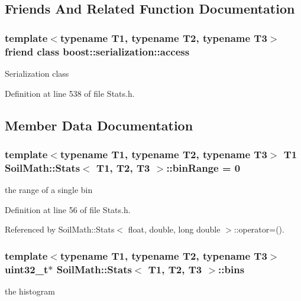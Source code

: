 \subsection{Friends And Related Function Documentation}
\hypertarget{class_soil_math_1_1_stats_ac98d07dd8f7b70e16ccb9a01abf56b9c}{}
\subsubsection[{boost\+::serialization\+::access}]{\setlength{\rightskip}{0pt plus 5cm}template$<$typename T1, typename T2, typename T3$>$ friend class boost\+::serialization\+::access\hspace{0.3cm}{\ttfamily [friend]}}\label{class_soil_math_1_1_stats_ac98d07dd8f7b70e16ccb9a01abf56b9c}
Serialization class 

Definition at line 538 of file Stats.\+h.



\subsection{Member Data Documentation}
\hypertarget{class_soil_math_1_1_stats_a00be1d2a705a8aba532fbe726001bbb2}{}
\subsubsection[{bin\+Range}]{\setlength{\rightskip}{0pt plus 5cm}template$<$typename T1, typename T2, typename T3$>$ T1 {\bf Soil\+Math\+::\+Stats}$<$ T1, T2, T3 $>$\+::bin\+Range = 0}\label{class_soil_math_1_1_stats_a00be1d2a705a8aba532fbe726001bbb2}
the range of a single bin 

Definition at line 56 of file Stats.\+h.



Referenced by Soil\+Math\+::\+Stats$<$ float, double, long double $>$\+::operator=().

\hypertarget{class_soil_math_1_1_stats_a00778b298b1ebb335eb0c4eed69e471c}{}
\subsubsection[{bins}]{\setlength{\rightskip}{0pt plus 5cm}template$<$typename T1, typename T2, typename T3$>$ uint32\+\_\+t$\ast$ {\bf Soil\+Math\+::\+Stats}$<$ T1, T2, T3 $>$\+::bins}\label{class_soil_math_1_1_stats_a00778b298b1ebb335eb0c4eed69e471c}
the histogram 

